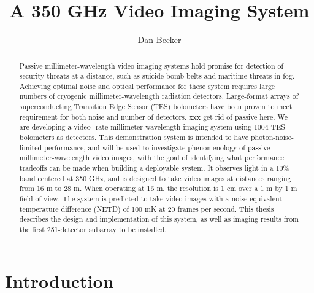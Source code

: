 \documentclass[12pt,letterpaper]{memoir}
\title{A 350 GHz Video Imaging System}
\author{Dan Becker}
\numberwithin{equation}{chapter}
\numberwithin{figure}{chapter}
\numberwithin{table}{chapter}
\begin{document}
\maketitle

\frontmatter

\begin{abstract}
Passive millimeter-wavelength video imaging systems hold promise for detection of security threats at a distance, such as suicide bomb belts and maritime threats in fog.
Achieving optimal noise and optical performance for these system requires large numbers of cryogenic millimeter-wavelength radiation detectors. Large-format arrays of superconducting Transition Edge Sensor (TES) bolometers have been proven to meet requirement for both noise and number of detectors. xxx get rid of passive here.
We are developing a video- rate millimeter-wavelength imaging system using 1004 TES bolometers as detectors.
This demonstration system is intended to have photon-noise-limited performance, and will be used to investigate phenomenology of passive millimeter-wavelength video images, with the goal of identifying what performance tradeoffs can be made when building a deployable system.
It observes light in a 10\% band centered at 350 GHz, and is designed to take video images at distances ranging from 16 m to 28 m.
When operating at 16 m, the resolution is 1 cm over a 1 m by 1 m field of view.
The system is predicted to take video images with a noise equivalent temperature difference (NETD) of 100 mK at 20 frames per second.
This thesis describes the design and implementation of this system, as well as imaging results from the first 251-detector subarray to be installed.
\end{abstract}

\newpage

\tableofcontents* %

\mainmatter

\chapter{Introduction}\label{c:intro}

\end{document}
